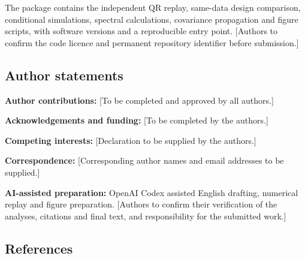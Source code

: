 \documentclass[
  10pt,
  a4paper,
]{article}
\begin{document}
The package contains the independent QR replay, same-data design
comparison, conditional simulations, spectral calculations, covariance
propagation and figure scripts, with software versions and a
reproducible entry point. {[}Authors to confirm the code licence and
permanent repository identifier before submission.{]}

\singlespacing

\hypertarget{author-statements}{%
\subsection{Author statements}\label{author-statements}}

\textbf{Author contributions:} {[}To be completed and approved by all
authors.{]}

\textbf{Acknowledgements and funding:} {[}To be completed by the
authors.{]}

\textbf{Competing interests:} {[}Declaration to be supplied by the
authors.{]}

\textbf{Correspondence:} {[}Corresponding author names and email
addresses to be supplied.{]}

\textbf{AI-assisted preparation:} OpenAI Codex assisted English
drafting, numerical replay and figure preparation. {[}Authors to confirm
their verification of the analyses, citations and final text, and
responsibility for the submitted work.{]}

\clearpage

\singlespacing

\hypertarget{references}{%
\subsection{References}\label{references}}
\end{document}
